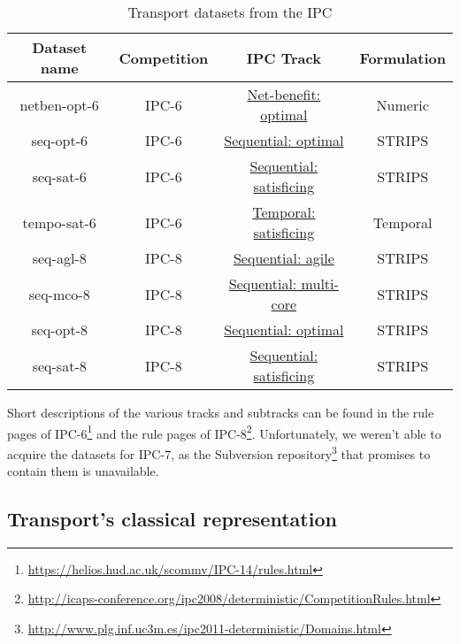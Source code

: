 \begin{table}
\begin{tabular}{c|c|c|c}
\textbf{Dataset name} & \textbf{Competition} & \textbf{IPC Track} & \textbf{Formulation} \\ 
\hline
\hline
netben-opt-6 & IPC-6 & \href{http://icaps-conference.org/ipc2008/deterministic/NetBenefitOptimization.html}{Net-benefit: optimal} & Numeric \\ 
seq-opt-6 & IPC-6 & \href{http://icaps-conference.org/ipc2008/deterministic/SequentialOptimization.html}{Sequential: optimal} & STRIPS \\ 
seq-sat-6 & IPC-6 & \href{http://icaps-conference.org/ipc2008/deterministic/SequentialSatisficing.html}{Sequential: satisficing} & STRIPS \\ 
tempo-sat-6 & IPC-6 & \href{http://icaps-conference.org/ipc2008/deterministic/TemporalSatisficing.html}{Temporal: satisficing} & Temporal \\ 
\hline
seq-agl-8 & IPC-8 & \href{https://helios.hud.ac.uk/scommv/IPC-14/seqagi.html}{Sequential: agile} & STRIPS \\ 
seq-mco-8 & IPC-8 & \href{https://helios.hud.ac.uk/scommv/IPC-14/seqmulti.html}{Sequential: multi-core} & STRIPS \\ 
seq-opt-8 & IPC-8 & \href{https://helios.hud.ac.uk/scommv/IPC-14/seqopt.html}{Sequential: optimal} & STRIPS \\ 
seq-sat-8 & IPC-8 & \href{https://helios.hud.ac.uk/scommv/IPC-14/seqsat.html}{Sequential: satisficing} & STRIPS \\ 
\end{tabular}
\caption{Transport datasets from the IPC}
\end{table}

Short descriptions of the various tracks and subtracks can be found in the rule pages of IPC-6\footnote{\url{https://helios.hud.ac.uk/scommv/IPC-14/rules.html}}
and the rule pages of IPC-8\footnote{\url{http://icaps-conference.org/ipc2008/deterministic/CompetitionRules.html}}.
Unfortunately, we weren't able to acquire the datasets for IPC-7, as the Subversion repository\footnote{\url{http://www.plg.inf.uc3m.es/ipc2011-deterministic/Domains.html}} that promises to contain them is unavailable.

\subsection{Transport's classical representation}


